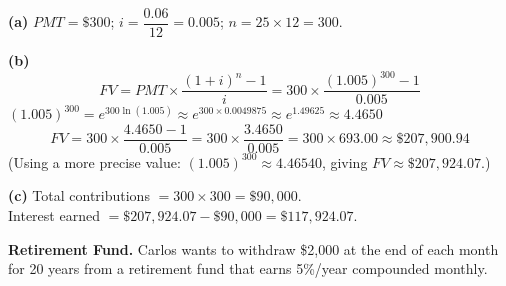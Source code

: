 \documentclass[addpoints]{exam}
\begin{document}
\begin{questions}

\begin{solution}
\textbf{(a)} $PMT = \$300$; \quad $i = \dfrac{0.06}{12} = 0.005$; \quad $n = 25 \times 12 = 300$.

\textbf{(b)}
\[
FV = PMT \times \frac{(1+i)^n - 1}{i}
   = 300 \times \frac{(1.005)^{300} - 1}{0.005}
\]
$(1.005)^{300} = e^{300\ln(1.005)} \approx e^{300 \times 0.0049875} \approx e^{1.49625} \approx 4.4650$
\[
FV = 300 \times \frac{4.4650 - 1}{0.005}
   = 300 \times \frac{3.4650}{0.005}
   = 300 \times 693.00
   \approx \$207{,}900.94
\]
(Using a more precise value: $(1.005)^{300} \approx 4.46540$, giving $FV \approx \$207{,}924.07$.)

\textbf{(c)}
Total contributions $= 300 \times 300 = \$90{,}000$.\\
Interest earned $= \$207{,}924.07 - \$90{,}000 = \$117{,}924.07$.
\end{solution}

\vspace{5mm}

\question[6]
\textbf{Retirement Fund.}
Carlos wants to withdraw \$2{,}000 at the end of each month for 20 years from a retirement fund that earns 5\%/year compounded monthly.



\end{questions}
\end{document}
